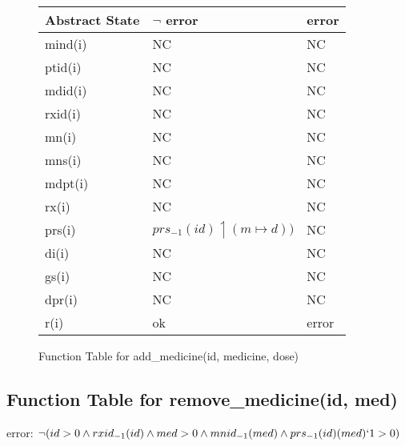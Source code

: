 \begin{figure}[h]
\begin{center}
\begin{tabular}{|l|l|l|}
\hline
Abstract State & $\neg$ error & error \\ \hline
mind(i)        &   NC        & NC    \\ \hline
ptid(i)        &     NC      & NC    \\ \hline
mdid(i)        &   NC        & NC    \\ \hline
rxid(i)        &     NC      & NC    \\ \hline
mn(i)          &    NC       & NC    \\ \hline
mns(i)         &   NC        & NC    \\ \hline
mdpt(i)        &   NC        & NC    \\ \hline
rx(i)          &      NC     & NC    \\ \hline
prs(i)         &     $prs_{-1}(id) \upharpoonleft (m \mapsto d))$      & NC    \\ \hline
di(i)          &      NC     & NC    \\ \hline
gs(i)          &     NC      & NC    \\ \hline
dpr(i)         &     NC      & NC    \\ \hline
r(i)           & ok        & error \\ \hline
\end{tabular}
\caption{Function Table for add\_medicine(id, medicine, dose)}
\label{ft-am}
\end{center}
\end{figure}

\newpage

\subsection{Function Table for remove\_medicine(id, med)}

error: $\neg (id > 0 \wedge rxid_{-1}(id) \wedge med > 0  \wedge mnid_{-1}(med) \wedge prs_{-1}(id)(med)`1 > 0)$

